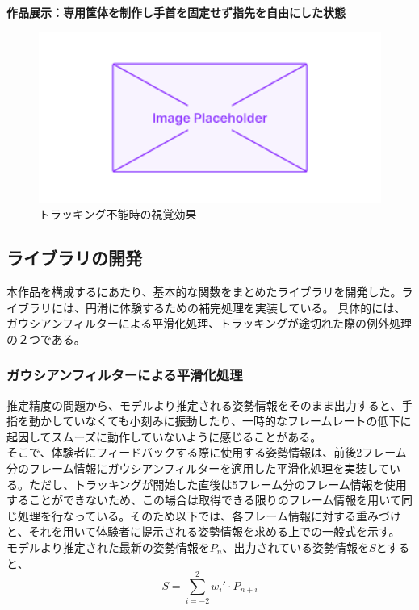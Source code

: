 \textbf{作品展示：専用筐体を制作し手首を固定せず指先を自由にした状態}
\begin{figure}[H]
  \centering
  \includegraphics[width=15cm]{img/placeholder.png}
  \caption{トラッキング不能時の視覚効果}
  \label{fig:kyotai_ver2}
\end{figure}

\subsection{ライブラリの開発}
本作品を構成するにあたり、基本的な関数をまとめたライブラリを開発した。ライブラリには、円滑に体験するための補完処理を実装している。
具体的には、ガウシアンフィルターによる平滑化処理、トラッキングが途切れた際の例外処理の２つである。

\subsubsection*{ガウシアンフィルターによる平滑化処理}
推定精度の問題から、モデルより推定される姿勢情報をそのまま出力すると、手指を動かしていなくても小刻みに振動したり、一時的なフレームレートの低下に起因してスムーズに動作していないように感じることがある。\\
そこで、体験者にフィードバックする際に使用する姿勢情報は、前後2フレーム分のフレーム情報にガウシアンフィルターを適用した平滑化処理を実装している。ただし、トラッキングが開始した直後は5フレーム分のフレーム情報を使用することができないため、この場合は取得できる限りのフレーム情報を用いて同じ処理を行なっている。そのため以下では、各フレーム情報に対する重みづけと、それを用いて体験者に提示される姿勢情報を求める上での一般式を示す。
モデルより推定された最新の姿勢情報を\(P_{n}\)、出力されている姿勢情報を\(S\)とすると、
  \begin{equation}
    S = \sum_{i=-2}^{2} w_i' \cdot P_{n+i}
    \end{equation}

